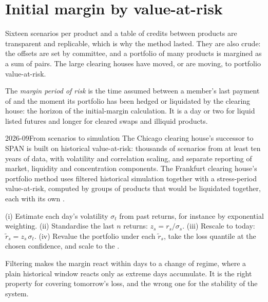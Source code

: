 \section{Initial margin by value-at-risk}

Sixteen scenarios per product and a table of credits between products are
transparent and replicable, which is why the method lasted. They are also
crude: the offsets are set by committee, and a portfolio of many products is
margined as a sum of pairs. The large clearing houses have moved, or are
moving, to portfolio value-at-risk.

\begin{definition}\label{def:m1:margin:mpor}
The \emph{margin period of risk} is the time
assumed between a member's last payment of  and the moment
its portfolio has been hedged or liquidated by the clearing house: the
horizon of the initial-margin calculation. It is a day or two for liquid
listed futures and longer for cleared swaps and illiquid products.
\end{definition}

\begin{dated}{2026-09}{From scenarios to simulation}\label{dat:m1:margin:models}
The Chicago clearing house's successor to SPAN is built on historical
value-at-risk: thousands of scenarios from at least ten years of data, with
volatility and correlation scaling, and separate reporting of market,
liquidity and concentration components. The Frankfurt clearing house's
portfolio method uses filtered historical simulation together with a
stress-period value-at-risk, computed by groups of products that would be
liquidated together, each with its own .
\end{dated}

\begin{method}\label{met:m1:margin:fhs}
(i) Estimate each day's volatility $\sigma_t$ from past returns, for instance
by exponential weighting. (ii) Standardise the last $n$ returns:
$z_s = r_s/\sigma_s$. (iii) Rescale to today: $\tilde r_s = z_s\,\sigma_t$.
(iv) Revalue the portfolio under each $\tilde r_s$, take the loss quantile at
the chosen confidence, and scale to the .
\end{method}

Filtering makes the margin react within days to a change of regime, where a
plain historical window reacts only as extreme days accumulate. It is the
right property for covering tomorrow's loss, and the wrong one for the
stability of the system.

